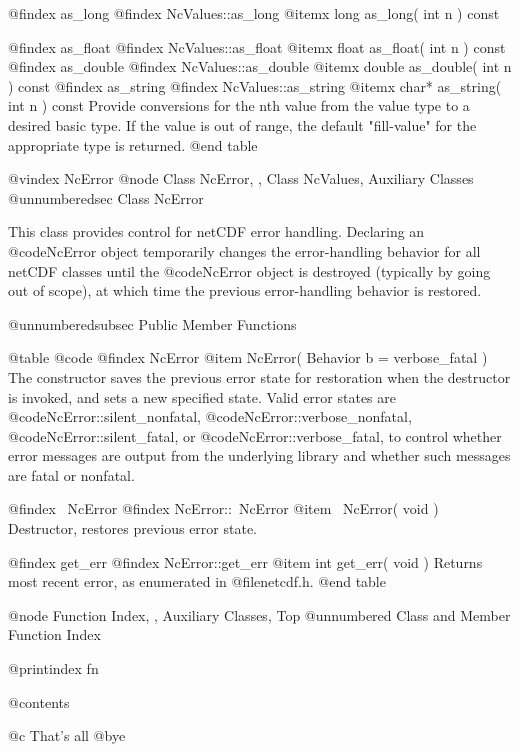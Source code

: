 @findex as_long
@findex NcValues::as_long
@itemx long as_long( int n ) const

@findex as_float
@findex NcValues::as_float
@itemx float as_float( int n ) const
@findex as_double
@findex NcValues::as_double
@itemx double as_double( int n ) const
@findex as_string
@findex NcValues::as_string
@itemx char* as_string( int n ) const
Provide conversions for the nth value from the value type to a desired
basic type.  If the value is out of range, the default "fill-value" for
the appropriate type is returned.
@end table

@vindex NcError
@node Class NcError,  , Class NcValues, Auxiliary Classes
@unnumberedsec  Class NcError

This class provides control for netCDF error handling.  Declaring an
@code{NcError} object temporarily changes the error-handling behavior
for all netCDF classes until the @code{NcError} object is destroyed
(typically by going out of scope), at which time the previous
error-handling behavior is restored.

@unnumberedsubsec Public Member Functions

@table @code
@findex NcError
@item NcError( Behavior b = verbose_fatal )
The constructor saves the previous error state for restoration when the
destructor is invoked, and sets a new specified state.  Valid error
states are @code{NcError::silent_nonfatal},
@code{NcError::verbose_nonfatal}, @code{NcError::silent_fatal}, or
@code{NcError::verbose_fatal}, to control whether error messages are
output from the underlying library and whether such messages are fatal
or nonfatal.

@findex ~NcError
@findex NcError::~NcError
@item ~NcError( void )
Destructor, restores previous error state.

@findex get_err
@findex NcError::get_err
@item int get_err( void )
Returns most recent error, as enumerated in @file{netcdf.h}.
@end table

@node Function Index,  , Auxiliary Classes, Top
@unnumbered Class and Member Function Index

@printindex fn

@contents

@c That's all
@bye
